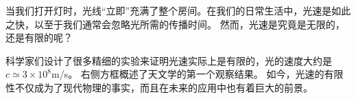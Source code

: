
当我们打开灯时，光线“立即”充满了整个房间。在我们的日常生活中，光速是如此之快，以至于我们通常会忽略光所需的传播时间。 然而，光速是究竟是无限的，还是有限的呢？

科学家们设计了很多精细的实验来证明光速实际上是有限的，光的速度大约是 $c\simeq 3\times 10^8 $m/s。 右侧方框概述了天文学的第一个观察结果。 如今，光速的有限性不仅成为了现代物理的事实，而且在未来的应用中也有着巨大的前景。

